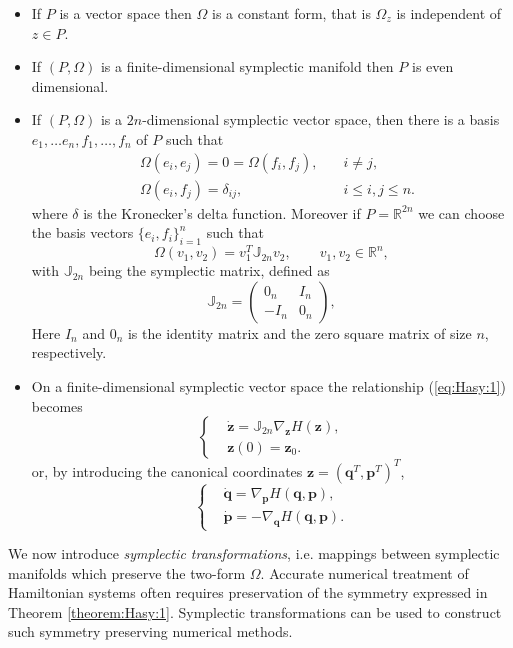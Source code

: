 \begin{itemize}
\item If $P$ is a vector space then $\Omega$ is a constant form, that is $\Omega_z$ is independent of $z\in P$. 
\item If $(P,\Omega)$ is a finite-dimensional symplectic manifold then $P$ is even dimensional.
\item If $(P,\Omega)$ is a $2n$-dimensional symplectic vector space, then there is a basis $e_1,\dots e_n,f_1, \dots , f_n$ of $P$ such that
\begin{equation} \label{eq:Hasy:4}
\begin{aligned}
	& \Omega(e_i,e_j) = 0 = \Omega(f_i,f_j), \quad & i\neq j,\\
	& \Omega(e_i,f_j) = \delta_{ij}, & i\leq i,j \leq n.
\end{aligned}
\end{equation}
where $\delta$ is the Kronecker's delta function. Moreover if $P = \mathbb{R}^{2n}$ we can choose the basis vectors $\{e_i,f_i\}_{i=1}^n$ such that
\begin{equation} \label{eq:Hasy:5}
	\Omega(v_1,v_2) = v_1^T \mathbb J_{2n} v_2, \qquad v_1,v_2\in \mathbb R^n,
\end{equation}
with $\mathbb J_{2n}$ being the symplectic matrix, defined as
\begin{equation} \label{eq:Hasy:6}
	\mathbb{J}_{2n} = 
	\begin{pmatrix}
		0_n & I_n \\
		-I_n & 0_n
	\end{pmatrix},
\end{equation}
Here $I_n$ and $0_n$ is the identity matrix and the zero square matrix of size $n$, respectively.
\item On a finite-dimensional symplectic vector space the relationship (\ref{eq:Hasy:1}) becomes
\begin{equation} \label{eq:Hasy:7}
\left\{
\begin{aligned}
	&\dot {\mathbf z} = \mathbb{J}_{2n} \nabla_{\mathbf z} H(\mathbf z), \\
	& \mathbf z(0) = \mathbf z_0.
\end{aligned}
\right.
\end{equation}
or, by introducing the canonical coordinates $\mathbf z = (\mathbf q^T, \mathbf p^T)^T$,
\begin{equation} \label{eq:Hasy:8}
\left\{
\begin{aligned}
	&\dot {\mathbf q} = \nabla_{\mathbf p} H(\mathbf q,\mathbf p),\\
	&\dot {\mathbf p} = - \nabla_{\mathbf q} H(\mathbf q,\mathbf p).
\end{aligned}
\right.
\end{equation}
\end{itemize}
We now introduce \emph{symplectic transformations}, i.e. mappings between symplectic manifolds which preserve the two-form $\Omega$. Accurate numerical treatment of Hamiltonian systems often requires preservation of the symmetry expressed in Theorem \ref{theorem:Hasy:1}. Symplectic transformations can be used to construct such symmetry preserving numerical methods. 

